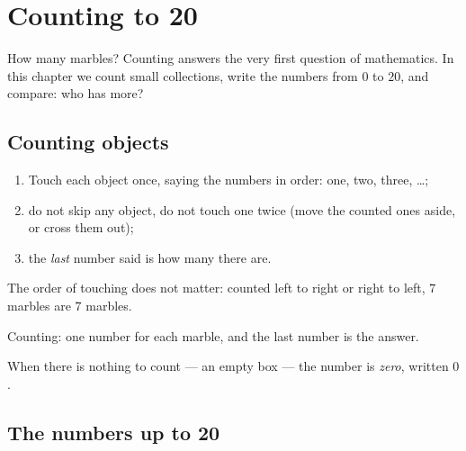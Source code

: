 \chapter{Counting to 20}\label{ch:g1:counting}

How many marbles? Counting answers the very first question of
mathematics. In this chapter we count small collections, write the
numbers from $0$ to $20$, and compare: who has more?

\section{Counting objects}

\begin{method}\label{met:g1:counting:how}
\begin{enumerate}
  \item Touch each object once, saying the numbers in order: one,
        two, three, \dots;
  \item do not skip any object, do not touch one twice (move the
        counted ones aside, or cross them out);
  \item the \emph{last} number said is how many there are.
\end{enumerate}
The order of touching does not matter: counted left to right or
right to left, $7$ marbles are $7$ marbles.
\end{method}

\begin{omfigure}

{\small Counting: one number for each marble, and the last number is
the answer.}
\end{omfigure}

\begin{definition}[Zero]\label{def:g1:counting:zero}
When there is nothing to count --- an empty box --- the number is
\emph{zero}, written $0$.
\end{definition}

\section{The numbers up to 20}

